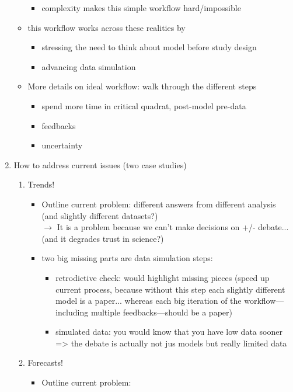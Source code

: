 \documentclass[11pt]{article}
\begin{document}
\begin{enumerate}
\begin{itemize}
\begin{itemize}
\item complexity makes this simple workflow hard/impossible
\end{itemize}
\item this workflow works across these realities by
\begin{itemize}
\item stressing the need to think about model before study design
\item advancing data simulation
\end{itemize}
\item More details on ideal workflow:  walk through the different steps
\begin{itemize}
\item spend more time in critical quadrat, post-model pre-data
\item feedbacks
\item uncertainty
\end{itemize}
\end{itemize}
\item How to address current issues (two case studies)
\begin{enumerate}
\item Trends!
\begin{itemize}
\item Outline current problem: different answers from different analysis (and slightly different datasets?)\\
$\rightarrow$ It is a problem because we can't make decisions on +/- debate... (and it degrades trust in science?)
\item two big missing parts are data simulation steps:
\begin{itemize}
\item retrodictive check: would highlight missing pieces (speed up current process, because without this step each slightly different model is a paper... whereas each big iteration of the workflow---including multiple feedbacks---should be a paper)
\item simulated data: you would know that you have low data sooner => the debate is actually not jus models but really limited data
\end{itemize}
\end{itemize}
\item Forecasts!
\begin{itemize}
\item Outline current problem:

\end{itemize}
\end{enumerate}
\end{enumerate}
\end{document}
